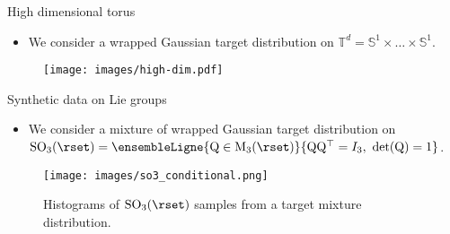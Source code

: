    
   \begin{frame}{High dimensional torus}
   
       \begin{itemize}
           \item We consider a wrapped Gaussian target distribution on $\mathbb{T}^d = {\mathbb{S}^1 \times \dots \times \mathbb{S}^1}$.
         \end{itemize}
       \pause
       \vspace{-0.5em}
       \begin{figure}[t]
           \centering
           \texttt{[image: images/high-dim.pdf]}
           \label{fig:high-dim}
       \end{figure}
   
   \end{frame}
   
   
   \begin{frame}{Synthetic data on Lie groups}
   
   \begin{itemize}
       \item We consider a mixture of wrapped Gaussian target distribution on
       $\mathrm{SO}_3(\rset) = \ensembleLigne{\mathrm{Q} \in
         \mathrm{M}_3(\rset)}{\mathrm{Q} \mathrm{Q}^\top = I_3, \
         \det(\mathrm{Q})=1}$.
     \end{itemize}
   \pause
   \begin{figure}[t]
       \centering
           \texttt{[image: images/so3\_conditional.png]}
           \label{fig:so3_conditional}
           \vspace{-0.5em}
       \caption{Histograms of $\mathrm{SO}_3(\rset)$ samples from a target mixture distribution.
        }
       \label{fig:so3}
       \vspace{-0.5em}
   \end{figure}
   
   \end{frame}
   

